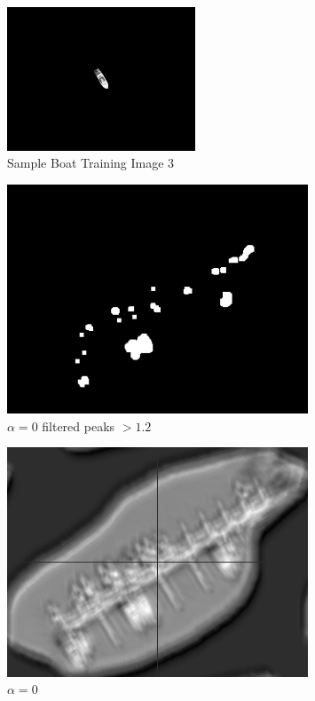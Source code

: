 \documentclass[12pt]{article}
\begin{document}
\begin{figure}
\centering
\includegraphics[width=0.50\textwidth]{plotBoat3.png}
\caption{Sample Boat Training Image 3}
\label{boats3}
\end{figure}

\begin{figure}
\centering
\includegraphics[width=0.80\textwidth]{v2/boats_a00_peak.png}
\caption{\(\alpha=0\) filtered peaks \(> 1.2\)}
\label{a00peak}
\end{figure}

\begin{figure}
\centering
\includegraphics[width=0.80\textwidth]{v2/boats_a00.png}
\caption{\(\alpha=0\)}
\label{a00}
\end{figure}
\end{document}
